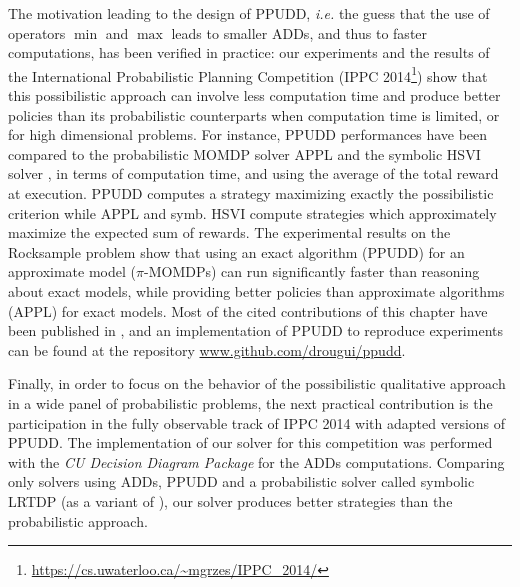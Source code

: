 The motivation leading to the design of PPUDD,
\textit{i.e.} the guess that the use of operators $\min$ and $\max$ 
leads to smaller ADDs, and thus to faster computations,
has been verified in practice:
our experiments and the results 
of the International Probabilistic Planning Competition (IPPC 2014\footnote{\url{https://cs.uwaterloo.ca/~mgrzes/IPPC_2014/}})
show that this possibilistic approach
can involve less computation time
and produce better policies
than its probabilistic counterparts
when computation time is limited,
or for high dimensional problems.
For instance, 
PPUDD performances have been compared 
to the probabilistic MOMDP solver APPL \cite{Kurniawati-RSS08,OngShaoHsuWee-IJRR10}
and the symbolic HSVI solver \cite{Sim:2008:SHS:1620163.1620241},
in terms of computation time, 
and using the average of 
the total reward at execution. 
PPUDD computes a strategy maximizing 
exactly the possibilistic criterion 
while APPL and symb. HSVI compute strategies
which approximately maximize the expected sum of rewards.
The experimental results on the Rocksample problem 
show that using an exact algorithm 
(PPUDD) for an approximate model ($\pi$-MOMDPs) 
can run significantly faster 
than reasoning about exact models, 
while providing better policies 
than approximate algorithms (APPL) 
for exact models.
Most of the cited contributions of this chapter
have been published in \cite{DBLP:conf/aaai/DrougardTFD14},
and an implementation of PPUDD 
to reproduce experiments 
can be found 
at the repository \url{www.github.com/drougui/ppudd}.

Finally, in order to focus on the behavior 
of the possibilistic qualitative approach 
in a wide panel of probabilistic problems, 
the next practical contribution 
is the participation 
in the fully observable track of IPPC 2014
with adapted versions of PPUDD.
The implementation of our solver for this competition 
was performed with the \textit{CU Decision Diagram Package}
for the ADDs computations. 
Comparing only solvers using ADDs, 
PPUDD and a probabilistic solver 
called symbolic LRTDP \cite{symbLRTDP}
(as a variant of \cite{Bonet03labeledrtdp}),
our solver produces better strategies 
than the probabilistic approach.

